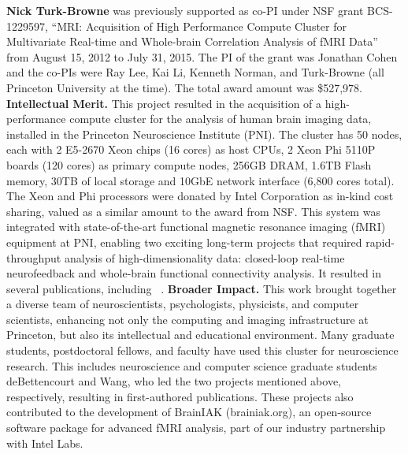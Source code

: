 

\textbf{Nick Turk-Browne} was previously supported as co-PI under NSF
grant BCS-1229597, ``MRI: Acquisition of High Performance Compute
Cluster for Multivariate Real-time and Whole-brain Correlation
Analysis of fMRI Data'' from August 15, 2012 to July 31, 2015. The PI
of the grant was Jonathan Cohen and the co-PIs were Ray Lee, Kai Li,
Kenneth Norman, and Turk-Browne (all Princeton University at the
time). The total award amount was \$527,978.
{\bf Intellectual Merit.} This project resulted in the acquisition of
a high-performance compute cluster for the analysis of human brain
imaging data, installed in the Princeton Neuroscience Institute (PNI).
The cluster has 50 nodes, each with 2 E5-2670 Xeon chips
(16 cores) as host CPUs, 2 Xeon Phi 5110P boards (120 cores) as primary compute nodes, 256GB DRAM, 1.6TB Flash memory,
30TB of local storage and 10GbE network interface (6,800 cores total).
The Xeon and Phi processors were donated by Intel Corporation as
in-kind cost sharing, valued as a similar amount to the award from
NSF. This system was integrated with state-of-the-art functional
magnetic resonance imaging (fMRI) equipment at PNI, enabling two
exciting long-term projects that required rapid-throughput analysis of
high-dimensionality data: closed-loop real-time neurofeedback and
whole-brain functional connectivity analysis. It resulted in several
publications, including
~\citep{Cohen:2017,deBettencourt:2015,Turk-Browne:2013,Wang:2015}.
{\bf Broader Impact.} This work brought together a diverse team of
neuroscientists, psychologists, physicists, and computer scientists,
enhancing not only the computing and imaging infrastructure at
Princeton, but also its intellectual and educational environment. Many
graduate students, postdoctoral fellows, and faculty have used this
cluster for neuroscience research. This includes neuroscience and
computer science graduate students deBettencourt and Wang, who led
the two projects mentioned above, respectively, resulting in
first-authored publications. These projects also contributed to the
development of BrainIAK (brainiak.org), an open-source software package for advanced fMRI analysis, part of our industry partnership with Intel Labs.

